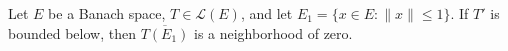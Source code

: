 Let $E$ be a Banach space, $T \in \mathcal{L}(E)$, and let $E_1 = \{x \in E : \|x\| \leq 1\}$. If $T'$ is bounded below, then $\overline{T(E_1)}$ is a neighborhood of zero.

